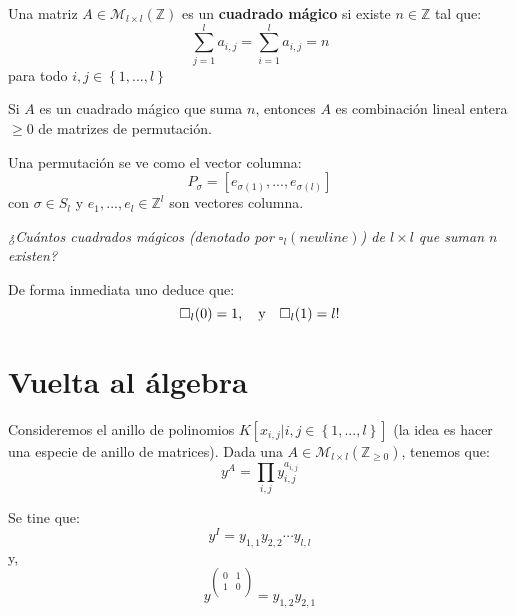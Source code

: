 \documentclass[12pt]{report}
\newcounter{it}
\theoremstyle{largebreak}
\begin{document}
    \begin{mydef}
        Una matriz $A\in\mathcal{M}_{l\times l}(\mathbb{Z})$ es un \textbf{cuadrado mágico} si existe $n\in\mathbb{Z}$ tal que:
        \begin{equation*}
            \sum_{ j=1}^la_{ i,j}=\sum_{ i=1}^la_{ i,j}=n
        \end{equation*}
        para todo $i,j\in\left\{1,...,l\right\}$
    \end{mydef}

    \begin{theor}
        Si $A$ es un cuadrado mágico que suma $n$, entonces $A$ es combinación lineal entera $\geq0$ de matrizes de permutación.
    \end{theor}

    \begin{obs}
        Una permutación se ve como el vector columna:
        \begin{equation*}
            P_\sigma=[e_{\sigma(1)},...,e_{\sigma(l)}]
        \end{equation*}
        con $\sigma\in S_l$ y $e_1,...,e_l\in\mathbb{Z}^l$ son vectores columna.
    \end{obs}

    \begin{center}
        \textit{¿Cuántos cuadrados mágicos (denotado por $\square_l(newline)$) de $l\times l$ que suman $n$ existen?}
    \end{center}

    De forma inmediata uno deduce que:
    \begin{equation*}
        \square_l(0)=1,\quad\textup{y}\quad\square_l(1)=l!
    \end{equation*}

    \section{Vuelta al álgebra}

    Consideremos el anillo de polinomios $K[x_{ i,j}\Big|i,j\in\left\{1,...,l \right\}]$ (la idea es hacer una especie de anillo de matrices). Dada una $A\in\mathcal{M}_{ l\times l}(\mathbb{Z}_{\geq0})$, tenemos que:
    \begin{equation*}
        y^A=\prod_{ i,j}y_{ i,j}^{a_{i,j}}
    \end{equation*}

    \begin{exa}
        Se tine que:
        \begin{equation*}
            y^I=y_{ 1,1}y_{ 2,2}\cdots y_{ l,l}
        \end{equation*}
        y,
        \begin{equation*}
            y^{\left(
                \begin{array}{cc}
                    0 & 1 \\
                    1 & 0 \\
                \end{array}
            \right)}=y_{ 1,2}y_{ 2,1}
        \end{equation*}
    \end{exa}
\end{document}
